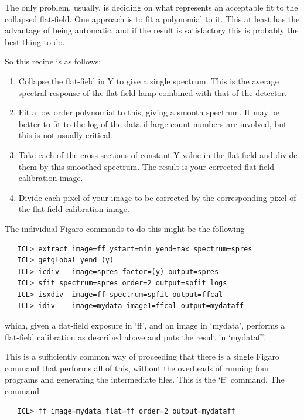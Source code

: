 \documentclass[11pt,twoside]{article}
\begin{document}
   The only problem, usually, is deciding on what represents an
   acceptable fit to the collapsed flat-field.  One approach is to fit a
   polynomial to it.  This at least has the advantage of being
   automatic, and if the result is satisfactory this is probably the
   best thing to do.

   So this recipe is as follows:

\begin{enumerate}
\item
   Collapse the flat-field in Y to give a single spectrum.  This is the
   average spectral response of the flat-field lamp combined with that
   of the detector.
\item
   Fit a low order polynomial to this, giving a smooth spectrum.  It may
   be better to fit to the log of the data if large count numbers are
   involved, but this is not usually critical.
\item
   Take each of the cross-sections of constant Y value in the flat-field
   and divide them by this smoothed spectrum.  The result is your
   corrected flat-field calibration image.
\item
   Divide each pixel of your image to be corrected by the corresponding
   pixel of the flat-field calibration image.
\end{enumerate}

The individual Figaro commands to do this might be the following

\begin{verbatim}
   ICL> extract image=ff ystart=min yend=max spectrum=spres
   ICL> getglobal yend (y)
   ICL> icdiv   image=spres factor=(y) output=spres
   ICL> sfit spectrum=spres order=2 output=spfit logs
   ICL> isxdiv  image=ff spectrum=spfit output=ffcal
   ICL> idiv    image=mydata image1=ffcal output=mydataff
\end{verbatim}

   which, given a flat-field exposure in `ff', and an image in `mydata',
   performs a flat-field calibration as described above and puts the
   result in `mydataff'.

   This is a sufficiently common way of proceeding that there is a
   single Figaro command that performs all of this, without the
   overheads of running four programs and generating the intermediate
   files.  This is the `ff' command. The command

\begin{verbatim}
   ICL> ff image=mydata flat=ff order=2 output=mydataff
\end{verbatim}
\end{document}
